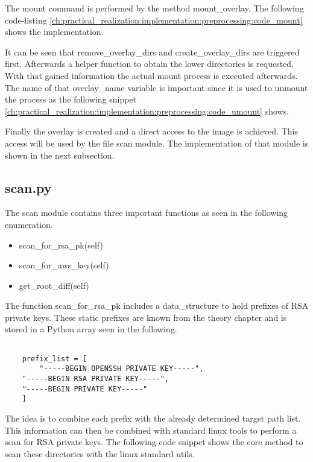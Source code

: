 The mount command is performed by the method  mount\_overlay. The following code-listing \ref{ch:practical_realization:implementation:preprocessing:code_mount} shows the implementation.

It can be seen that remove\_overlay\_dirs and create\_overlay\_dirs are triggered first. Afterwards a helper function to obtain the lower directories is requested. With that gained information the actual mount process is executed afterwards. The name of that overlay\_name variable is important since it is used to unmount the process as the following snippet \ref{ch:practical_realization:implementation:preprocessing:code_umount} shows.


Finally the overlay is created and a direct access to the image is achieved. This access will be used by the file scan module. The implementation of that module is shown in the next subsection.

\subsection{scan.py}
\label{ch:practical_realization:implementation:scan}
The scan module contains three important functions as seen in the following enumeration.
\begin{itemize}
\item scan\_for\_rsa\_pk(self)
\item scan\_for\_aws\_key(self)
\item get\_root\_diff(self)
\end{itemize}
The function scan\_for\_rsa\_pk includes a data\_structure to hold prefixes of RSA private keys.
These static prefixes are known from the theory chapter and is stored in a Python array seen in the following.
\lstset{language=Python}          %
\begin{lstlisting}[]  % Start your code-block
	
    prefix_list = [
    	"-----BEGIN OPENSSH PRIVATE KEY-----",
	"-----BEGIN RSA PRIVATE KEY-----",
	"-----BEGIN PRIVATE KEY-----"
	]
\end{lstlisting}
The idea is to combine each prefix with the already determined target path list.
This information can then be combined with standard linux tools to perform a scan for RSA private keys.
The following code snippet shows the core method to scan these directories with the linux standard utils.

